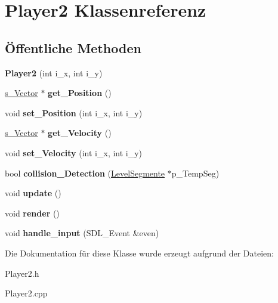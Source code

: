 \hypertarget{class_player2}{\section{Player2 Klassenreferenz}
\label{class_player2}
}
\subsection*{Öffentliche Methoden}
\begin{DoxyCompactItemize}
\item 
\hypertarget{class_player2_ac21206d9a2860c10a510a8200e5b1d82}{{\bfseries Player2} (int i\-\_\-x, int i\-\_\-y)}\label{class_player2_ac21206d9a2860c10a510a8200e5b1d82}

\item 
\hypertarget{class_player2_a78d7625285d5fab78431e257325f5592}{\hyperlink{structs___vector}{s\-\_\-\-Vector} $\ast$ {\bfseries get\-\_\-\-Position} ()}\label{class_player2_a78d7625285d5fab78431e257325f5592}

\item 
\hypertarget{class_player2_a3a6f363502f4241020de0e641dad4111}{void {\bfseries set\-\_\-\-Position} (int i\-\_\-x, int i\-\_\-y)}\label{class_player2_a3a6f363502f4241020de0e641dad4111}

\item 
\hypertarget{class_player2_a05675802549c3f3458fa38129ee77cfd}{\hyperlink{structs___vector}{s\-\_\-\-Vector} $\ast$ {\bfseries get\-\_\-\-Velocity} ()}\label{class_player2_a05675802549c3f3458fa38129ee77cfd}

\item 
\hypertarget{class_player2_a0a386cf73970cab8fb22462fbc252fa3}{void {\bfseries set\-\_\-\-Velocity} (int i\-\_\-x, int i\-\_\-y)}\label{class_player2_a0a386cf73970cab8fb22462fbc252fa3}

\item 
\hypertarget{class_player2_a8433489a1c934924f93b3164194e6bbb}{bool {\bfseries collision\-\_\-\-Detection} (\hyperlink{class_level_segmente}{Level\-Segmente} $\ast$p\-\_\-\-Temp\-Seg)}\label{class_player2_a8433489a1c934924f93b3164194e6bbb}

\item 
\hypertarget{class_player2_a930161d0d6bad9b47852ff1127da3ff5}{void {\bfseries update} ()}\label{class_player2_a930161d0d6bad9b47852ff1127da3ff5}

\item 
\hypertarget{class_player2_a4a4b0e14f00b815f6b190939d83be5fa}{void {\bfseries render} ()}\label{class_player2_a4a4b0e14f00b815f6b190939d83be5fa}

\item 
\hypertarget{class_player2_abbe0b72e64e8d72b88dd2f2f87b61e94}{void {\bfseries handle\-\_\-input} (S\-D\-L\-\_\-\-Event \&even)}\label{class_player2_abbe0b72e64e8d72b88dd2f2f87b61e94}

\end{DoxyCompactItemize}


Die Dokumentation für diese Klasse wurde erzeugt aufgrund der Dateien\-:\begin{DoxyCompactItemize}
\item 
Player2.\-h\item 
Player2.\-cpp\end{DoxyCompactItemize}
